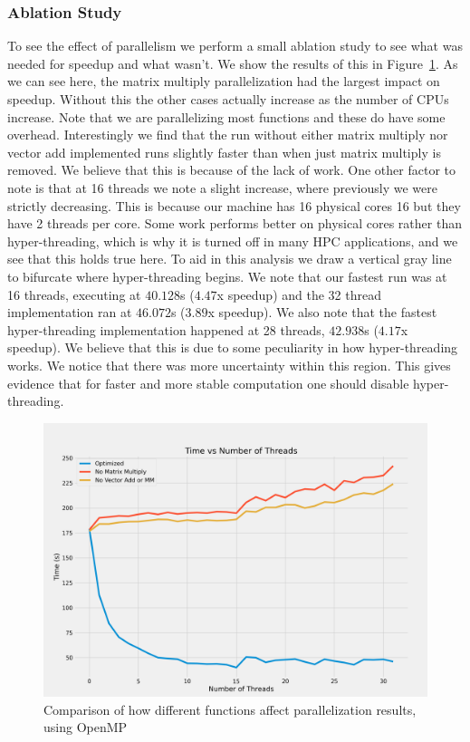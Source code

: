 \subsubsection{Ablation Study}

To see the effect of parallelism we perform a small ablation study to see what
was needed for speedup and what wasn't. We show the results of this in
Figure~\ref{fig:omp}. As we can see here, the matrix multiply parallelization
had the largest impact on speedup. Without this the other cases actually
increase as the number of CPUs increase. Note that we are parallelizing most
functions and these do have some overhead. Interestingly we find that the run
without either matrix multiply nor vector add implemented runs slightly faster
than when just matrix multiply is removed. We believe that this is because of
the lack of work. One other factor to note is that at 16 threads we note a
slight increase, where previously we were strictly decreasing. This is because
our machine has 16 physical cores 16 but they have 2 threads per core. Some work
performs better on physical cores rather than hyper-threading, which is why it
is turned off in many HPC applications, and we see that this holds true here. To
aid in this analysis we draw a vertical gray line to bifurcate where
hyper-threading begins. We
note that our fastest run was at 16 threads, executing at $40.128$s ($4.47$x
speedup) and the 32 thread implementation ran at $46.072$s ($3.89$x speedup). We
also note that the fastest hyper-threading implementation happened at 28
threads, $42.938$s ($4.17$x speedup). We believe that this is due to some
peculiarity in how hyper-threading works. We notice that there was more
uncertainty within this region. This gives evidence that for faster and more
stable computation one should disable hyper-threading.

\begin{figure}[ht]
\centering
\includegraphics[width=\linewidth]{omp.png}
\caption{Comparison of how different functions affect parallelization results,
    using OpenMP}
    \label{fig:omp}
\end{figure}

